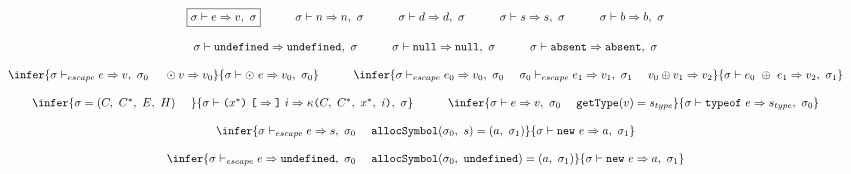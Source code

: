 \documentclass[11pt]{article}
\newcommand{\Term}[1]{\texttt{#1}}
\newcommand{\cs}[0]{\quad}
\newcommand{\symstate}[0]{\sigma}
\newcommand{\symctx}[0]{C}
\newcommand{\symctxstack}[0]{C^*}
\newcommand{\symenv}[0]{E}
\newcommand{\symheap}[0]{H}
\newcommand{\symuop}[0]{\odot}
\newcommand{\symbop}[0]{\oplus}
\newcommand{\symstatetuple}[4]{(#1,\ #2,\ #3,\ #4)}
\newcommand{\symstdef}[0]
{\symstatetuple{\symctx}{\symctxstack}{\symenv}{\symheap}}
\newcommand{\valcont}[4]{\kappa \Term{(} #1,\ #2,\ #3,\ #4 \Term{)}}
\newcommand{\evaluop}[2]{\symuop #1 \Rightarrow #2}
\newcommand{\evalbop}[3]{#1 \symbop #2 \Rightarrow #3}
\newcommand{\evalexpr}[4]{#1 \vdash #2 \Rightarrow #3,\ #4}
\newcommand{\evalescexpr}[4]{#1 \vdash_{escape} #2 \Rightarrow #3,\ #4}
\begin{document}
\[
\begin{array}{c}
\multicolumn{1}{c}{\begin{array}{ccccccccc}
\fbox{$\evalexpr{\symstate}{e}{v}{\symstate}$}
&
\cs
&
\evalexpr{\symstate}{n}{n}{\symstate}
&
\cs
&
\evalexpr{\symstate}{d}{d}{\symstate}
&
\cs
&
\evalexpr{\symstate}{s}{s}{\symstate}
&
\cs
&
\evalexpr{\symstate}{b}{b}{\symstate}
\end{array}}
\\ \\
\multicolumn{1}{c}{\begin{array}{ccccc}
\evalexpr{\symstate}{\Term{undefined}}{\Term{undefined}}{\symstate}
&
\cs
&
\evalexpr{\symstate}{\Term{null}}{\Term{null}}{\symstate}
&
\cs
&
\evalexpr{\symstate}{\Term{absent}}{\Term{absent}}{\symstate}
\end{array}}
\\ \\
\multicolumn{1}{c}{\begin{array}{ccc}
\infer
{\evalescexpr{\symstate}{e}{v}{\symstate_0}\ \ \ \
\evaluop{v}{v_0}}
{\evalexpr{\symstate}{\odot\ e}{v_0}{\symstate_0}}
&
\cs
&
\infer
{\evalescexpr{\symstate}{e_0}{v_0}{\symstate_0}\ \ \ \
\evalescexpr{\symstate_0}{e_1}{v_1}{\symstate_1}\ \ \ \
\evalbop{v_0}{v_1}{v_2}}
{\evalexpr{\symstate}{e_0\ \oplus\ e_1}{v_2}{\symstate_1}}
\end{array}}
\\ \\
\multicolumn{1}{c}{\begin{array}{ccc}
\infer
{\symstate = \symstdef\ \ \ \ }
{\evalexpr
{\symstate}
{\Term{(} x^* \Term{)}\ \Term{[} \Rightarrow \Term{]}\ i}
{\valcont{\symctx}{\symctxstack}{x^*}{i}}
{\symstate}}
&
\cs
&
\infer
{\evalexpr{\symstate}{e}{v}{\symstate_0}\ \ \ \
\Term{getType}(v)=s_{type}}
{\evalexpr{\symstate}{\Term{typeof}\ e}{s_{type}}{\symstate_0}}
\end{array}}
\\ \\
\infer
{\evalescexpr{\symstate}{e}{s}{\symstate_0}\ \ \ \
\Term{allocSymbol}(\symstate_0,\ s) = (a,\ \symstate_1)}
{\evalexpr{\symstate}{\Term{new}\ e}{a}{\symstate_1}}
\\ \\ 
\infer
{\evalescexpr{\symstate}{e}{\Term{undefined}}{\symstate_0}\ \ \ \
\Term{allocSymbol}(\symstate_0,\ \Term{undefined}) = (a,\ \symstate_1)}
{\evalexpr{\symstate}{\Term{new}\ e}{a}{\symstate_1}}

\end{array}\]
\end{document}
